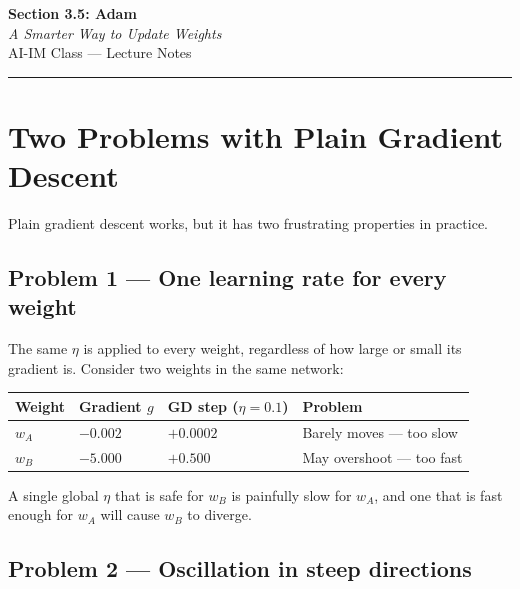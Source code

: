 \documentclass[12pt, a4paper]{article}
\begin{document}
\begin{center}
  {\LARGE \textbf{Section 3.5: Adam}} \\[0.3em]
  {\large\itshape A Smarter Way to Update Weights} \\[0.5em]
  {\large AI-IM Class --- Lecture Notes}%
  \ifstudentmode
  \fi
\end{center}

\vspace{1em}
\hrule
\vspace{1.5em}

\section{Two Problems with Plain Gradient Descent}

Plain gradient descent works, but it has two frustrating properties in
practice.

\subsection*{Problem 1 — One learning rate for every weight}

The same $\eta$ is applied to every weight, regardless of how large or small
its gradient is.  Consider two weights in the same network:

\begin{center}
  \renewcommand{\arraystretch}{1.3}
  \begin{tabular}{llll}
    \toprule
    Weight & Gradient $g$ & GD step ($\eta=0.1$) & Problem                    \\
    \midrule
    $w_A$  & $-0.002$     & $+0.0002$            & Barely moves --- too slow  \\
    $w_B$  & $-5.000$     & $+0.500$             & May overshoot --- too fast \\
    \bottomrule
  \end{tabular}
\end{center}

A single global $\eta$ that is safe for $w_B$ is painfully slow for $w_A$,
and one that is fast enough for $w_A$ will cause $w_B$ to diverge.

\subsection*{Problem 2 — Oscillation in steep directions}
\end{document}
